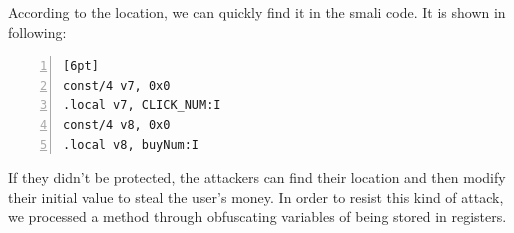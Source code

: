 \noindent According to the location, we can quickly find it in the smali code. It is shown in following:

\begin{lstlisting}[language={[ANSI]C}, backgroundcolor=\color{backcolour},
numbers=left,numberstyle=\tiny,keywordstyle=\color{blue},commentstyle=\color{red!50!green!50!blue!50}][6pt]
const/4 v7, 0x0
.local v7, CLICK_NUM:I
const/4 v8, 0x0
.local v8, buyNum:I
\end{lstlisting}

\noindent  If they didn't be protected, the attackers can find their location and then modify their initial value to steal the user's money. In order to resist this kind of attack, we processed a method through obfuscating variables of being stored in registers.

